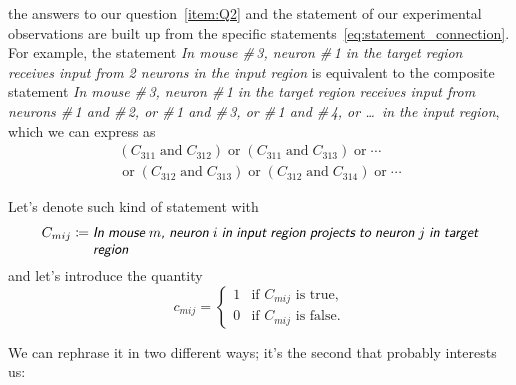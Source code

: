 \documentclass[\ifafour a4paper,12pt,\else a5paper,10pt,\fi%
onecolumn,oneside,article,%
british%
]{memoir}
\theoremstyle{remark}
\theoremstyle{innote}
\newcommand*{\defd}{\coloneqq}
\renewcommand*{\|}[1][]{\nonscript\,#1\vert\nonscript\;\mathopen{}}
\newcommand*{\yC}{C}
\newcommand*{\yc}{c}
\newcommand*{\statm}[1]{\textsl{\textsf{#1}}}
\begin{document}
the answers to our
question~\ref{item:Q2} and the statement of our experimental observations
are built up from the specific statements~\eqref{eq:statement_connection}.
For example, the statement \statm{In mouse \#\,3, neuron \#\,1 in the
  target region receives input from 2 neurons in the input region} is
equivalent to the composite statement \statm{In mouse \#\,3, neuron \#\,1
  in the target region receives input from neurons \#\,1 and \#\,2, or
  \#\,1 and \#\,3, or \#\,1 and \#\,4, or \ldots\ in the input region},
which we can express as
\begin{multline}
  (\yC_{311} \mathbin{\text{and}} \yC_{312}) \mathbin{\text{or}}
  (\yC_{311} \mathbin{\text{and}} \yC_{313}) \mathbin{\text{or}}
  \dotsb{}\\ {}\mathbin{\text{or}}
  (\yC_{312} \mathbin{\text{and}} \yC_{313}) \mathbin{\text{or}}
  (\yC_{312} \mathbin{\text{and}} \yC_{314}) \mathbin{\text{or}}
  \dotsb{}
\end{multline}





 Let's denote such kind of statement with
\begin{equation}
  \label{eq:statement_connection}
  \yC_{mij} \defd \parbox[t]{0.8\linewidth}{\statm{In mouse $m$, neuron $i$ in input region projects to neuron $j$ in target region}}
\end{equation}
and let's introduce the quantity
\begin{equation}
  \label{eq:quantity_connection}
  \yc_{mij} =
  \begin{cases}
    1&\text{if $\yC_{mij}$ is true},\\
    0&\text{if $\yC_{mij}$ is false}.
  \end{cases}
\end{equation}











We can rephrase it in
two different ways; it's the second that probably interests us:
\end{document}
